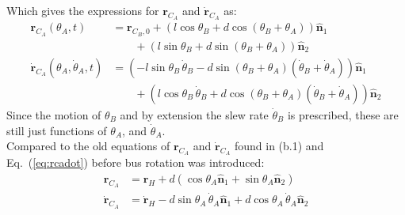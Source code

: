 \documentclass[titlepage]{article}
\begin{document}
\newpage

\begin{mdframed}[linewidth=1pt, innertopmargin=10pt, innerbottommargin=10pt]
	Which gives the expressions for $\boldsymbol{r}_{C_A}$ and $\dot{\boldsymbol{r}}_{C_A}$ as:
	\begin{equation}
		\begin{split}
			\boldsymbol{r}_{C_A}(\theta_A,t)&=\boldsymbol{r}_{C_B,0}+\left(l\cos\theta_B+d\cos(\theta_B+\theta_A)\right)\hat{\boldsymbol{n}}_1 \\
			&\qquad+\left(l\sin\theta_B+d\sin(\theta_B+\theta_A)\right)\hat{\boldsymbol{n}}_2 \\
			\dot{\boldsymbol{r}}_{C_A}(\theta_A,\dot{\theta}_A,t)&=\left(-l\sin\theta_B\,\dot{\theta}_B-d\sin(\theta_B+\theta_A)\left(\dot{\theta}_B+\dot{\theta}_A\right)\right)\hat{\boldsymbol{n}}_1 \\
			&\qquad+\left(l\cos\theta_B\,\dot{\theta}_B+d\cos(\theta_B+\theta_A)\left(\dot{\theta}_B+\dot{\theta}_A\right)\right)\hat{\boldsymbol{n}}_2
		\end{split}
		\label{eq:e1answers}
	\end{equation}
	Since the motion of $\theta_B$ and by extension the slew rate $\dot{\theta}_B$ is prescribed, these are still just functions of $\theta_A$, and $\dot{\theta}_A$.\\
	
	Compared to the old equations of $\boldsymbol{r}_{C_A}$ and $\dot{\boldsymbol{r}}_{C_A}$ found in (b.1) and Eq.~(\ref{eq:rcadot}) before bus rotation was introduced:
	\begin{equation}
		\begin{split}
			\boldsymbol{r}_{C_A}&=\boldsymbol{r}_H+d\left(\cos\theta_A\hat{\boldsymbol{n}}_1+\sin\theta_A\hat{\boldsymbol{n}}_2\right) \\
			\dot{\boldsymbol{r}}_{C_A}&=\dot{\boldsymbol{r}}_H-d\sin\theta_A\,\dot{\theta}_A\hat{\boldsymbol{n}}_1+d\cos\theta_A\,\dot{\theta}_A\hat{\boldsymbol{n}}_2
		\end{split}
	\end{equation}
	

\end{mdframed}
\end{document}
